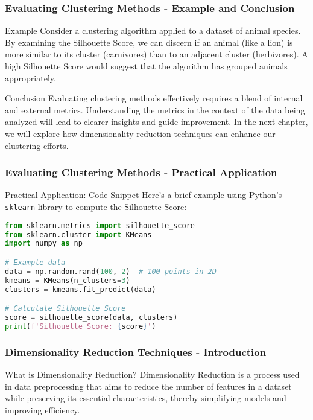 \documentclass[aspectratio=169]{beamer}
\begin{document}
\begin{frame}[fragile]
    \frametitle{Evaluating Clustering Methods - Example and Conclusion}
    
    \begin{block}{Example}
        Consider a clustering algorithm applied to a dataset of animal species. 
        By examining the Silhouette Score, we can discern if an animal (like a lion) is more similar to its cluster (carnivores) than to an adjacent cluster (herbivores). A high Silhouette Score would suggest that the algorithm has grouped animals appropriately.
    \end{block}
    
    \begin{block}{Conclusion}
        Evaluating clustering methods effectively requires a blend of internal and external metrics. Understanding the metrics in the context of the data being analyzed will lead to clearer insights and guide improvement. In the next chapter, we will explore how dimensionality reduction techniques can enhance our clustering efforts.
    \end{block}
\end{frame}

\begin{frame}[fragile]
    \frametitle{Evaluating Clustering Methods - Practical Application}
    
    \begin{block}{Practical Application: Code Snippet}
    Here’s a brief example using Python’s \texttt{sklearn} library to compute the Silhouette Score:
    \begin{lstlisting}[language=Python]
from sklearn.metrics import silhouette_score
from sklearn.cluster import KMeans
import numpy as np

# Example data
data = np.random.rand(100, 2)  # 100 points in 2D
kmeans = KMeans(n_clusters=3)
clusters = kmeans.fit_predict(data)

# Calculate Silhouette Score
score = silhouette_score(data, clusters)
print(f'Silhouette Score: {score}')
    \end{lstlisting}
    \end{block}
\end{frame}

\begin{frame}[fragile]
    \frametitle{Dimensionality Reduction Techniques - Introduction}
    \begin{block}{What is Dimensionality Reduction?}
        Dimensionality Reduction is a process used in data preprocessing that aims to reduce the number of features in a dataset while preserving its essential characteristics, thereby simplifying models and improving efficiency.
    \end{block}
\end{frame}
\end{document}

